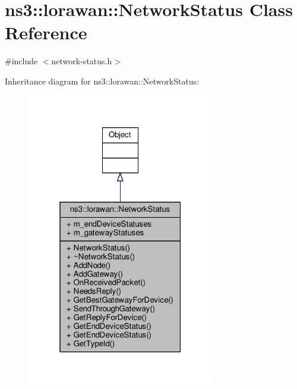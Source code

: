 \hypertarget{classns3_1_1lorawan_1_1NetworkStatus}{}\section{ns3\+:\+:lorawan\+:\+:Network\+Status Class Reference}
\label{classns3_1_1lorawan_1_1NetworkStatus}


{\ttfamily \#include $<$network-\/status.\+h$>$}



Inheritance diagram for ns3\+:\+:lorawan\+:\+:Network\+Status\+:
\nopagebreak
\begin{figure}[H]
\begin{center}
\leavevmode
\includegraphics[width=232pt]{classns3_1_1lorawan_1_1NetworkStatus__inherit__graph}
\end{center}
\end{figure}


